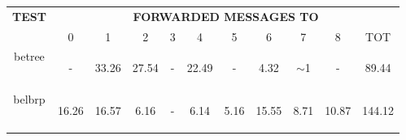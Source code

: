 \documentclass{article}
\begin{document}
		\begin{table}[H]
			\begin{center}
			    \begin{tabular}{|c|c|c|c|c|c|c|c|c|c|c|}
				    \hline
				    \multirow{2}{*}{\textbf{TEST}} & \multicolumn{10}{c|}{\textbf{FORWARDED MESSAGES TO}} \\ \cline{2-11}
					& 0 & 1 & 2 & 3 & 4 & 5& 6 & 7 & 8 & TOT \\ \hline
				    betree & \begin{footnotesize}-\end{footnotesize} & \begin{footnotesize}33.26\end{footnotesize} & \begin{footnotesize}27.54\end{footnotesize} & \begin{footnotesize}-\end{footnotesize} & \begin{footnotesize}22.49\end{footnotesize} & \begin{footnotesize}-\end{footnotesize} & \begin{footnotesize}4.32\end{footnotesize} & \begin{footnotesize}$\sim$1\end{footnotesize} & \begin{footnotesize}-\end{footnotesize} & \begin{footnotesize}89.44\end{footnotesize} \\ \hline
				    belbrp & \begin{footnotesize}16.26\end{footnotesize} & \begin{footnotesize}16.57\end{footnotesize} & \begin{footnotesize}6.16\end{footnotesize} & \begin{footnotesize}-\end{footnotesize} & \begin{footnotesize}6.14\end{footnotesize} & \begin{footnotesize}5.16\end{footnotesize} & \begin{footnotesize}15.55\end{footnotesize} & \begin{footnotesize}8.71\end{footnotesize} & \begin{footnotesize}10.87\end{footnotesize} & \begin{footnotesize}144.12\end{footnotesize}\\ \hline

\end{tabular}
\end{center}
\end{table}
\end{document}
